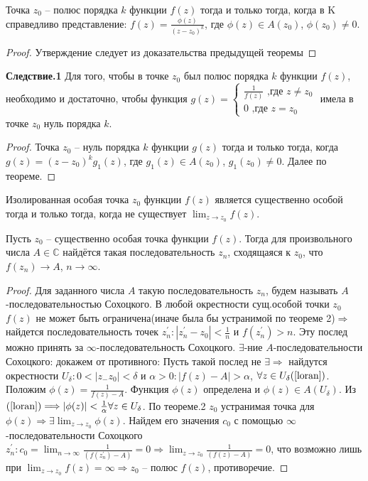 \begin{theorem}
   Точка $z_0$ – полюс порядка $k$ функции $f(z)$ тогда и только тогда, когда в K справедливо
   представление: $f(z)=\frac{\phi(z)}{(z-z_0)^k}$, где $\phi(z)\in A(z_0)$, $\phi(z_0)\neq 0$.
\end{theorem}
\begin{proof}
    Утверждение следует из доказательства предыдущей теоремы
\end{proof}
\textbf{Следствие.1}
Для того, чтобы в точке $z_0$ был полюс
порядка $k$ функции $f(z)$, необходимо и достаточно, чтобы функция $g(z)=\begin{cases}
    \frac{1}{f(z)} \text{ ,где } z\neq z_0\\
    0\text{ ,где } z=z_0
   \end{cases}$ имела в точке $z_0$ нуль порядка $k$.
\begin{proof}
    Точка $z_0$ – нуль порядка $k$ функции $g(z)$ тогда и только тогда, когда $g(z)=(z-z_0)^kg_1(z)$, где $g_1(z) \in A(z_0)$, $g_1(z_0)\neq0$. Далее по теореме.
\end{proof}
\begin{theorem}
   Изолированная особая точка $z_0$ функции
    $f(z)$ является существенно особой тогда и только тогда,
    когда не существует $\displaystyle\lim_{z\rightarrow z_0}f(z)$.
\end{theorem}

\begin{theorem}
Пусть $z_0$ – существенно особая точка функции $f(z)$. Тогда
для произвольного числа $A \in \mathbb{C}$ найдётся такая последовательность ${z_n}$, сходящаяся к $z_0$, что $f(z_n)\rightarrow A$, $n \rightarrow \infty$.
\end{theorem}
\begin{proof}
    Для заданного числа $A$ такую последовательность $z_n$, будем называть $A$-последовательностью Сохоцкого. В любой окрестности сущ.особой точки $z_0$ $f(z)$ не может быть ограничена(иначе была бы устранимой по теореме 2)$\Longrightarrow$ найдется последовательность точек $z_n^{'}: |z_n^{'}-z_0|<\frac{1}{n} \text{ и } f(z_n^{'}) > n.$ Эту послед можно принять за $\infty$-последовательность Сохоцкого. $\exists$-ние $A$-последовательности Сохоцкого: докажем от противного: Пусть такой послед не $\exists \Longrightarrow$ найдутся окрестности $U_\delta: 0<|z_-z_0|<\delta$ и $\alpha>0: |f(z)-A|>\alpha$, $\forall z \in U_\delta(\ref{loran})$.
    Положим $\phi(z)=\frac{1}{f(z)-A}$. Функция $\phi(z)$ определена и $\phi(z) \in A(U_\delta)$. Из $(\ref{loran})\Longrightarrow |\phi(z)|<\frac{1}{\alpha} \forall z \in U_\delta$. По теореме.2 $z_0$ устранимая точка для $\phi(z)\Longrightarrow \exists \displaystyle\lim_{z \rightarrow z_0}\phi(z)$. Найдем его значения $c_0$ с помощью $\infty$-последовательности Сохоцкого $z_n^{'}: 
    c_0 = \displaystyle \lim_{n \rightarrow \infty} \frac{1}{(f(z_n^{'})-A)}=0 \Longrightarrow \displaystyle \lim_{z \rightarrow z_0} \frac{1}{(f(z)-A)}=0$, что возможно лишь при $\displaystyle\lim_{z\rightarrow z_0}f(z)=\infty \Longrightarrow z_0$ -- полюс $f(z)$, противоречие. 
\end{proof}

